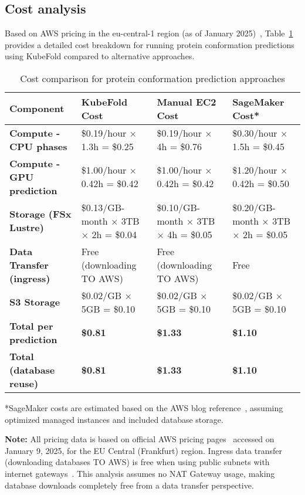 \subsection{Cost analysis}

Based on AWS pricing in the eu-central-1 region (as of January 2025)~\cite{aws-ec2-pricing,aws-fsx-pricing}, Table~\ref{tab:cost_analysis} provides a detailed cost breakdown for running protein conformation predictions using KubeFold compared to alternative approaches.

\begin{table}[H]
    \centering
    \small
    \begin{tabularx}{\textwidth}{|X|X|X|X|}
        \hline
        \textbf{Component} & \textbf{KubeFold Cost} & \textbf{Manual EC2 Cost} & \textbf{SageMaker Cost*} \\
        \hline
        \textbf{Compute - CPU phases} & \$0.19/hour × 1.3h = \$0.25 & \$0.19/hour × 4h = \$0.76 & \$0.30/hour × 1.5h = \$0.45 \\
        \hline
        \textbf{Compute - GPU prediction} & \$1.00/hour × 0.42h = \$0.42 & \$1.00/hour × 0.42h = \$0.42 & \$1.20/hour × 0.42h = \$0.50 \\
        \hline
        \textbf{Storage (FSx Lustre)} & \$0.13/GB-month × 3TB × 2h = \$0.04 & \$0.10/GB-month × 3TB × 4h = \$0.05 & \$0.20/GB-month × 3TB × 2h = \$0.05 \\
        \hline
        \textbf{Data Transfer (ingress)} & Free (downloading TO AWS) & Free (downloading TO AWS) & Free \\
        \hline
        \textbf{S3 Storage} & \$0.02/GB × 5GB = \$0.10 & \$0.02/GB × 5GB = \$0.10 & \$0.02/GB × 5GB = \$0.10 \\
        \hline
        \textbf{Total per prediction} & \textbf{\$0.81} & \textbf{\$1.33} & \textbf{\$1.10} \\
        \hline
        \textbf{Total (database reuse)} & \textbf{\$0.81} & \textbf{\$1.33} & \textbf{\$1.10} \\
        \hline
    \end{tabularx}
    \caption{Cost comparison for protein conformation prediction approaches}
    \label{tab:cost_analysis}
\end{table}

*SageMaker costs are estimated based on the AWS blog reference~\cite{aws-sagemaker-protein-folding}, assuming optimized managed instances and included database storage.

\textbf{Note:} All pricing data is based on official AWS pricing pages~\cite{aws-ec2-pricing,aws-fsx-pricing} accessed on January 9, 2025, for the EU Central (Frankfurt) region. Ingress data transfer (downloading databases TO AWS) is free when using public subnets with internet gateways~\cite{aws-ec2-pricing}. This analysis assumes no NAT Gateway usage, making database downloads completely free from a data transfer perspective.

